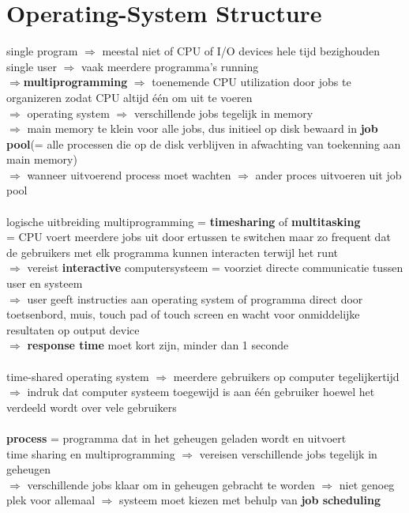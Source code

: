 \documentclass{report}
\begin{document}
\section{Operating-System Structure}
single program $\Rightarrow$ meestal niet of CPU of I/O devices hele tijd bezighouden
\\single user $\Rightarrow$ vaak meerdere programma's running
\\$\Rightarrow$\textbf{multiprogramming} $\Rightarrow$ toenemende CPU utilization door jobs te organizeren zodat CPU altijd \'e\'en om uit te voeren
\\$\Rightarrow$ operating system $\Rightarrow$ verschillende jobs tegelijk in memory
\\$\Rightarrow$ main memory te klein voor alle jobs, dus initieel op disk bewaard in \textbf{job pool}(= alle processen die op de disk verblijven in afwachting van toekenning aan main memory)
\\$\Rightarrow$ wanneer uitvoerend process moet wachten $\Rightarrow$ ander proces uitvoeren uit job pool
\\
\\logische uitbreiding multiprogramming = \textbf{timesharing} of \textbf{multitasking}
\\= CPU voert meerdere jobs uit door ertussen te switchen maar zo frequent dat de gebruikers met elk programma kunnen interacten terwijl het runt
\\$\Rightarrow$ vereist \textbf{interactive} computersysteem = voorziet directe communicatie tussen user en systeem
\\$\Rightarrow$ user geeft instructies aan operating system of programma direct door toetsenbord, muis, touch pad of touch screen en wacht voor onmiddelijke resultaten op output device
\\$\Rightarrow$ \textbf{response time} moet kort zijn, minder dan 1 seconde
\\
\\time-shared operating system $\Rightarrow$ meerdere gebruikers op computer tegelijkertijd
\\$\Rightarrow$ indruk dat computer systeem toegewijd is aan \'e\'en gebruiker hoewel het verdeeld wordt over vele gebruikers
\\
\\\textbf{process} = programma dat in het geheugen geladen wordt en uitvoert
\\time sharing en multiprogramming $\Rightarrow$ vereisen verschillende jobs tegelijk in geheugen 
\\$\Rightarrow$ verschillende jobs klaar om in geheugen gebracht te worden $\Rightarrow$ niet genoeg plek voor allemaal $\Rightarrow$ systeem moet kiezen met behulp van \textbf{job scheduling}
\end{document}
